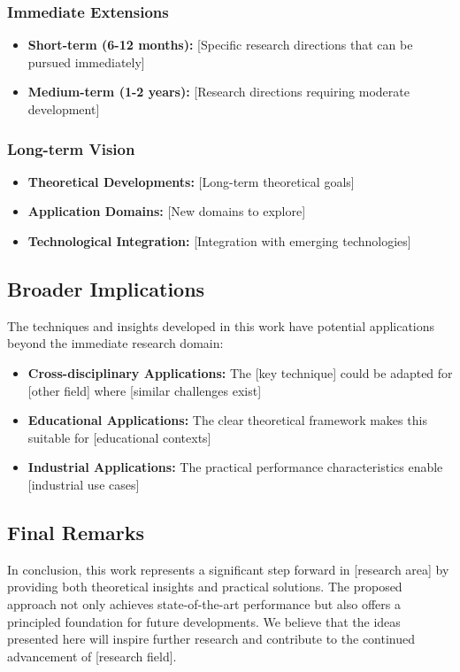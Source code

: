 \subsubsection{Immediate Extensions}
\begin{itemize}
    \item \textbf{Short-term (6-12 months):} [Specific research directions that can be pursued immediately]
    \item \textbf{Medium-term (1-2 years):} [Research directions requiring moderate development]
\end{itemize}

\subsubsection{Long-term Vision}
\begin{itemize}
    \item \textbf{Theoretical Developments:} [Long-term theoretical goals]
    \item \textbf{Application Domains:} [New domains to explore]
    \item \textbf{Technological Integration:} [Integration with emerging technologies]
\end{itemize}

\subsection{Broader Implications}

The techniques and insights developed in this work have potential applications beyond the immediate research domain:

\begin{itemize}
    \item \textbf{Cross-disciplinary Applications:} The [key technique] could be adapted for [other field] where [similar challenges exist]
    \item \textbf{Educational Applications:} The clear theoretical framework makes this suitable for [educational contexts]
    \item \textbf{Industrial Applications:} The practical performance characteristics enable [industrial use cases]
\end{itemize}

\subsection{Final Remarks}

In conclusion, this work represents a significant step forward in [research area] by providing both theoretical insights and practical solutions. The proposed approach not only achieves state-of-the-art performance but also offers a principled foundation for future developments. We believe that the ideas presented here will inspire further research and contribute to the continued advancement of [research field].

